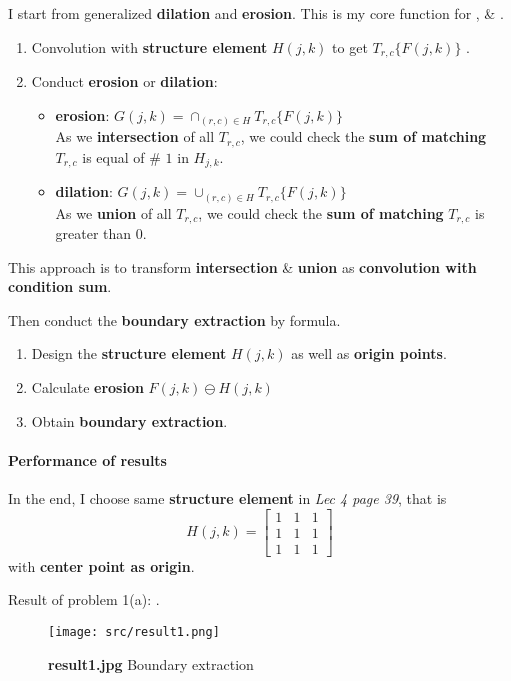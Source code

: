 I start from generalized \textbf{dilation} and \textbf{erosion}. This is my \alert{core function} for ,  \& .
\begin{enumerate}
    \item Convolution with \textbf{structure element} \(H(j, k)\) to get \(T_{r, c} \{F(j, k) \} \) .
    \item Conduct \textbf{erosion} or \textbf{dilation}:
	\begin{itemize}
	    \item \textbf{erosion}: \(G(j, k) = \cap_{(r, c) \in H} T_{r, c} \{F(j, k) \}  \) \\
		As we \textbf{intersection} of all \(T_{r, c}\), we could check the \textbf{sum of matching} \(T_{r, c}\) is \alert{equal} of \# \(1\) in \(H_{j, k}\).
	    \item \textbf{dilation}: \(G(j, k) = \cup_{(r, c) \in H} T_{r, c} \{F(j, k) \}  \) \\
		As we \textbf{union} of all \(T_{r, c}\), we could check the \textbf{sum of matching} \(T_{r, c}\) is \alert{greater than} \(0\).
	\end{itemize}
\end{enumerate}
This approach is to transform \textbf{intersection} \& \textbf{union} as \textbf{convolution with condition sum}.

Then conduct the \textbf{boundary extraction} by formula. 
\begin{enumerate}
    \item Design the \textbf{structure element} \(H(j, k)\) as well as \textbf{origin points}.
    \item Calculate \textbf{erosion} \(F(j, k) \ominus H(j, k) \)
    \item Obtain \textbf{boundary extraction}.
\end{enumerate}

\paragraph{Performance of results}
In the end, I choose same \textbf{structure element} in \textit{Lec 4 page 39}, that is
\[
    H(j, k) = \begin{bmatrix}
	1 & 1 & 1\\
	1 & 1 & 1\\
	1 & 1 & 1
    \end{bmatrix}
\]
with \textbf{center point as origin}.

Result of problem 1(a): .
\begin{figure}
    \centering
    \texttt{[image: src/result1.png]}
    \caption{\textbf{result1.jpg} Boundary extraction}
    \label{result1}
\end{figure}

